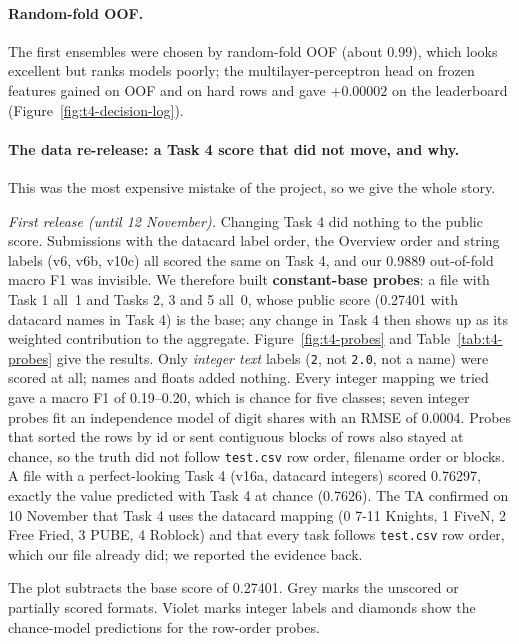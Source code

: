 \documentclass[../main.tex]{subfiles}
\begin{document}
\paragraph{Random-fold OOF.} The first ensembles were chosen by random-fold OOF (about 0.99), which looks excellent but ranks models poorly; the multilayer-perceptron head on frozen features gained on OOF and on hard rows and gave $+0.00002$ on the leaderboard (Figure~\ref{fig:t4-decision-log}).

\paragraph{The data re-release: a Task 4 score that did not move, and why.} This was the most expensive mistake of the project, so we give the whole story.

\emph{First release (until 12 November).} Changing Task 4 did nothing to the public score. Submissions with the datacard label order, the Overview order and string labels (v6, v6b, v10c) all scored the same on Task 4, and our 0.9889 out-of-fold macro F1 was invisible. We therefore built \textbf{constant-base probes}: a file with Task 1 all~1 and Tasks 2, 3 and 5 all~0, whose public score (0.27401 with datacard names in Task 4) is the base; any change in Task 4 then shows up as its weighted contribution to the aggregate. Figure~\ref{fig:t4-probes} and Table~\ref{tab:t4-probes} give the results. Only \emph{integer text} labels (\texttt{2}, not \texttt{2.0}, not a name) were scored at all; names and floats added nothing. Every integer mapping we tried gave a macro F1 of 0.19--0.20, which is chance for five classes; seven integer probes fit an independence model of digit shares with an RMSE of 0.0004. Probes that sorted the rows by id or sent contiguous blocks of rows also stayed at chance, so the truth did not follow \texttt{test.csv} row order, filename order or blocks. A file with a perfect-looking Task 4 (v16a, datacard integers) scored 0.76297, exactly the value predicted with Task 4 at chance (0.7626). The TA confirmed on 10 November that Task 4 uses the datacard mapping (0 7-11 Knights, 1 FiveN, 2 Free Fried, 3 PUBE, 4 Roblock) and that every task follows \texttt{test.csv} row order, which our file already did; we reported the evidence back.

The plot subtracts the base score of 0.27401. Grey marks the unscored or partially scored formats. Violet marks integer labels and diamonds show the chance-model predictions for the row-order probes.
\end{document}
